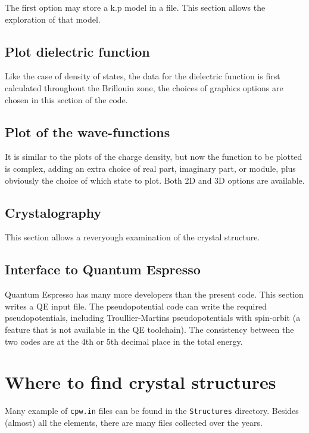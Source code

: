 \documentclass[11pt]{article}
\begin{document}
The first option may store a k.p model in a file.
This section allows the exploration of that model.

\subsection{Plot dielectric function}

Like the case of density of states, the data for the dielectric function
is first calculated throughout the Brillouin zone,
the choices of graphics options are chosen in this section of the code.

\subsection{Plot of the wave-functions}

It is similar to the plots of the charge density, but now the function
to be plotted is complex, adding an extra choice of real part, imaginary part,
or module, plus obviously the choice of which state to plot.
Both 2D and 3D options are available.

\subsection{Crystalography}

This section allows a reveryough examination of the crystal structure.

\subsection{Interface to Quantum Espresso}

Quantum Espresso has many more developers than the present code.
This section writes a QE input file.  The pseudopotential
code can write the required pseudopotentials,
including Troullier-Martins pseudopotentials with spin-orbit
(a feature that is not available in the QE toolchain).
The consistency between the two codes are at the 4th or 5th decimal
place in the total energy.

\section{Where to find crystal structures}

Many example of \texttt{cpw.in} files can be found in the \texttt{Structures} directory.
Besides (almost) all the elements, there are many files collected over the years.
\end{document}

